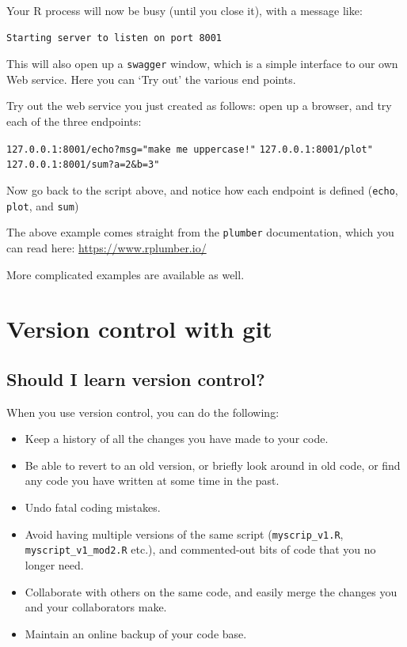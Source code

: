 \documentclass[]{book}
\providecommand{\tightlist}{%
  \setlength{\itemsep}{0pt}\setlength{\parskip}{0pt}}
\let\BeginKnitrBlock\begin \let\EndKnitrBlock\end
\begin{document}
Your R process will now be busy (until you close it), with a message like:

\begin{verbatim}
Starting server to listen on port 8001
\end{verbatim}

This will also open up a \texttt{swagger} window, which is a simple interface to our own Web service. Here you can `Try out' the various end points.

\BeginKnitrBlock{rmdtry}
Try out the web service you just created as follows: open up a browser, and try each of the three endpoints:

\texttt{127.0.0.1:8001/echo?msg="make\ me\ uppercase!"}
\texttt{127.0.0.1:8001/plot"}
\texttt{127.0.0.1:8001/sum?a=2\&b=3"}

Now go back to the script above, and notice how each endpoint is defined (\texttt{echo}, \texttt{plot}, and \texttt{sum})
\EndKnitrBlock{rmdtry}

\BeginKnitrBlock{rmdreading}
The above example comes straight from the \texttt{plumber} documentation, which you can read here: \url{https://www.rplumber.io/}

More complicated examples are available as well.
\EndKnitrBlock{rmdreading}

\hypertarget{versioncontrol}{%
\chapter{Version control with git}\label{versioncontrol}}

\hypertarget{shouldigit}{%
\section{Should I learn version control?}\label{shouldigit}}

When you use version control, you can do the following:

\begin{itemize}
\tightlist
\item
  Keep a history of all the changes you have made to your code.
\item
  Be able to revert to an old version, or briefly look around in old code, or find any code you have written at some time in the past.
\item
  Undo fatal coding mistakes.
\item
  Avoid having multiple versions of the same script (\texttt{myscrip\_v1.R}, \texttt{myscript\_v1\_mod2.R} etc.), and commented-out bits of code that you no longer need.
\item
  Collaborate with others on the same code, and easily merge the changes you and your collaborators make.
\item
  Maintain an online backup of your code base.
\end{itemize}
\end{document}
